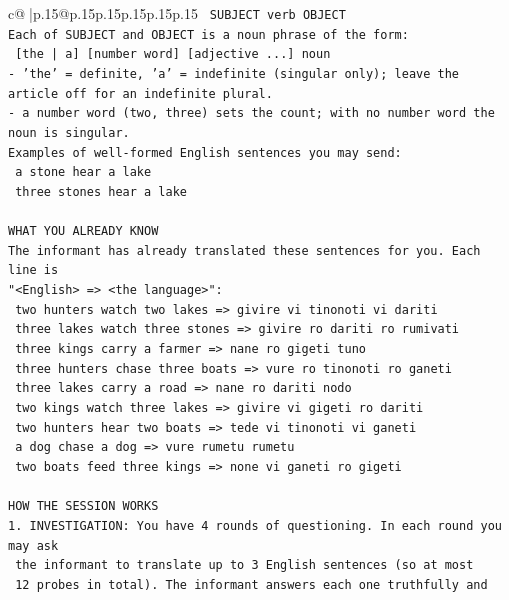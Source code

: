 \documentclass{article}
\begin{document}
{\begin{supertabular}{c@{$\;$}|p{.15\linewidth}@{}p{.15\linewidth}p{.15\linewidth}p{.15\linewidth}p{.15\linewidth}p{.15\linewidth}}
{{{\texttt{    SUBJECT  verb  OBJECT} \\
\texttt{Each of SUBJECT and OBJECT is a noun phrase of the form:} \\
\texttt{    {[}the | a{]}  {[}number word{]}  {[}adjective ...{]}  noun} \\
\texttt{{-} 'the' = definite, 'a' = indefinite (singular only); leave the article off for an indefinite plural.} \\
\texttt{{-} a number word (two, three) sets the count; with no number word the noun is singular.} \\
\texttt{Examples of well{-}formed English sentences you may send:} \\
\texttt{    a stone hear a lake} \\
\texttt{    three stones hear a lake} \\
\\ 
\texttt{WHAT YOU ALREADY KNOW} \\
\texttt{The informant has already translated these sentences for you. Each line is} \\
\texttt{"<English>  =>  <the language>":} \\
\texttt{    two hunters watch two lakes  =>  givire vi tinonoti vi dariti} \\
\texttt{    three lakes watch three stones  =>  givire ro dariti ro rumivati} \\
\texttt{    three kings carry a farmer  =>  nane ro gigeti tuno} \\
\texttt{    three hunters chase three boats  =>  vure ro tinonoti ro ganeti} \\
\texttt{    three lakes carry a road  =>  nane ro dariti nodo} \\
\texttt{    two kings watch three lakes  =>  givire vi gigeti ro dariti} \\
\texttt{    two hunters hear two boats  =>  tede vi tinonoti vi ganeti} \\
\texttt{    a dog chase a dog  =>  vure rumetu rumetu} \\
\texttt{    two boats feed three kings  =>  none vi ganeti ro gigeti} \\
\\ 
\texttt{HOW THE SESSION WORKS} \\
\texttt{1. INVESTIGATION: You have 4 rounds of questioning. In each round you may ask} \\
\texttt{   the informant to translate up to 3 English sentences (so at most} \\
\texttt{   12 probes in total). The informant answers each one truthfully and} \\
}}}
\end{supertabular}}
\end{document}
